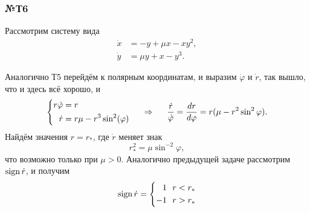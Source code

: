 \subsubsection*{№Т6}

Рассмотрим систему вида
\begin{align*}
    \dot{x} &= - y + \mu x - x y^2,\\
    \dot{y} &= \mu y + x - y^3.
\end{align*}



Аналогично Т5 перейдём к полярным координатам, и выразим $\dot{\varphi}$ и $\dot{r}$, так вышло, что и здесь всё хорошо, и
\begin{equation*}
    \left\{\begin{aligned}
        r \dot{\varphi} &= r \\
        \dot{r} &= r \mu - r^3 \sin^2 (\varphi)
    \end{aligned}\right.
    \hspace{0.5cm} \Rightarrow \hspace{0.5cm}
    \frac{\dot{r}}{\dot{\varphi}} = \frac{d r}{d \varphi} = 
    r (\mu - r^2 \sin^2 \varphi).
\end{equation*}
Найдём значения $r = r_*$, где $\dot{r}$ меняет знак
\begin{equation*}
    r_*^2 = \mu \sin^{-2} \varphi,
\end{equation*}
что возможно только при $\mu > 0$. Аналогично предыдущей задаче рассмотрим $\mathop{\mathrm{sign}}\nolimits \dot{r}$, и получим
\begin{equation*}
    \mathop{\mathrm{sign}}\nolimits \dot{r} = 
    \left\{\begin{aligned}
        1 & \ \  r < r_*   \\
        -1 & \ \ r > r_*
    \end{aligned}\right.
\end{equation*}

